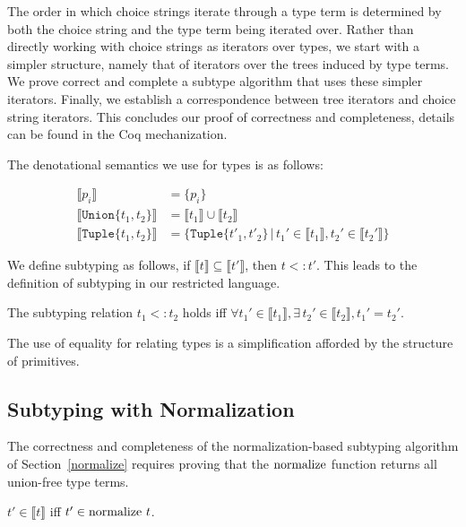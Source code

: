 \documentclass[a4paper,english]{lipics-v2019}
\newcommand{\xt}[1]{\texttt{#1}}
\newcommand{\tuplet}[2]{\xt{Tuple\{}#1,#2\xt{\}}}
\newcommand{\union}[2]{\xt{Union\{}#1,#2\xt{\}}}
\newcommand{\denotes}[1]{\llbracket #1 \rrbracket}
\renewcommand{\c}[1]{\ensuremath{\text{\lstinline{#1}}}\xspace}
\begin{document}
The order in which choice strings iterate through a type term is determined by
both the choice string and the type term being iterated over. Rather than
directly working with choice strings as iterators over types,
we start with a simpler structure, namely that of iterators over the trees
induced by type terms. We prove correct and complete a subtype algorithm
that uses these simpler iterators. Finally, we establish a correspondence 
between tree iterators and choice string iterators. This concludes our proof
of correctness and completeness, details can be found in the Coq
mechanization.

The denotational semantics we use for types is as follows:

\vspace{-5mm}
\begin{align*}
\denotes{p_i} &= \{p_i\} \\
\denotes{\union{t_1}{t_2}} &= \denotes{t_1} \cup \denotes{t_2} \\
\denotes{\tuplet{t_1}{t_2}} &= \{\tuplet{t'_1}{t'_2} \,|\, t_1' \in \denotes{t_1},  t_2' \in \denotes{t_2'}\}
\end{align*}
\vspace{-5mm}

\noindent
We define subtyping as follows, if $\denotes{t}\subseteq\denotes{t'}$, then
$t<:t'$.  This leads to the definition of subtyping in our restricted language.

\begin{definition}
 The subtyping relation $t_1 <: t_2$ holds iff $\forall t_1' \in
\denotes{t_1}, \exists\, t_2' \in \denotes{t_2}, t_1' =
t_2'$.\label{dfn:scr}
\end{definition}

\noindent
The use of equality for relating types is a simplification afforded by the
structure of primitives.

\subsection{Subtyping with Normalization}

The correctness and completeness of the normalization-based subtyping
algorithm of Section~\ref{normalize} requires proving that the \c{normalize}
function returns all union-free type terms.

\begin{lemma}[NF Equivalence]\label{lem:equiv_ndet}
$t' \in \denotes{t}$ iff $t' \in \c{normalize}~ t$.
\end{lemma}
\end{document}
